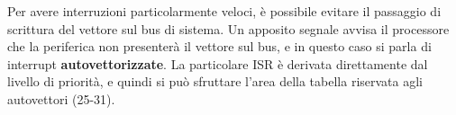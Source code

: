 Per avere interruzioni particolarmente veloci, è possibile evitare il passaggio di scrittura del vettore sul bus di sistema. Un apposito segnale avvisa il processore che la periferica non presenterà il vettore sul bus, e in questo caso si parla di interrupt \textbf{autovettorizzate}. La particolare ISR è derivata direttamente dal livello di priorità, e quindi si può sfruttare l'area della tabella riservata agli autovettori (25-31). 


